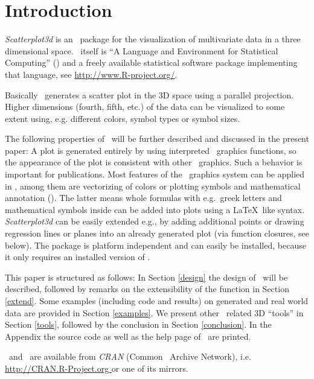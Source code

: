 \section{Introduction\label{introduction}}
\emph{Scatterplot3d} is an \RR\ package for the visualization of
multivariate data in a three dimensional space.
\RR\ itself is ``A Language and Environment for Statistical Computing'' (\cite{r-ref}) and a freely
available statistical software package implementing that language, see
\url{http://www.R-project.org/}.

Basically \sdd\ generates a scatter plot in the 3D space using a parallel
projection.  Higher dimensions (fourth, fifth, etc.) of the data can be
visualized to some extent using, e.g. different colors, symbol types or
symbol sizes.

The following properties of \sdd\ will be further described and discussed
in the present paper:
%
A plot is generated entirely by using interpreted \RR\ graphics functions,
so the appearance of the plot is consistent with other \RR\ graphics.
Such a behavior is %
important for publications.
Most features of the \RR\ graphics system can be applied in \sdd , among
them are vectorizing of colors or plotting symbols and mathematical
annotation (\cite{murrell00}).
The latter means whole formulas with e.g.\ greek letters and mathematical
symbols inside can be added into plots using a \LaTeX\ like syntax.
%
\emph{Scatterplot3d} can be easily extended e.g., by adding additional
points or drawing regression lines or planes into an already generated
plot (via function closures, see below).
The package is platform independent and can easily be installed,
because it only requires an installed version of \RR.

This paper is structured as follows:
%
In Section \ref{design} the design of \sdd\ will be described, followed by
remarks on the extensibility of the function in Section \ref{extend}.
%
Some examples (including code and results) on generated and real world data
are provided in Section \ref{examples}.
%
We present other \RR\ related 3D ``tools'' in Section \ref{tools}, followed
by the conclusion in Section \ref{conclusion}.
%
In the Appendix the source code as well as the help page of \sdd\ are
printed.

\RR\ and \sdd\ are available from \emph{CRAN} (Common \RR\ Archive
Network), i.e. \url{http://CRAN.R-Project.org } or one of its mirrors.

